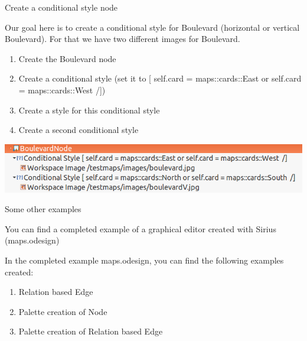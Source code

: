 \begin{frame}[allowframebreaks]{Create a conditional style node}

	Our goal here is to create a conditional style for Boulevard (horizontal or vertical Boulevard). For that we have two different images for Boulevard.

	\begin{enumerate}
		\item Create the Boulevard node
		\item Create a conditional style (set it to [ self.card = maps::cards::East or self.card = maps::cards::West  /])
		\item Create a style for this conditional style
		\item Create a second conditional style
	\end{enumerate}

	\centering
	\includegraphics[scale=0.3]{figs/BoulevardNode.png}
	
\end{frame}

\begin{frame}[allowframebreaks]{Some other examples}

	
	You can find a completed example of a graphical editor created with Sirius (maps.odesign)


	
	In the completed example maps.odesign, you can find the following examples created:

	\begin{enumerate}
		\item Relation based Edge
		\item Palette creation of Node
		\item Palette creation of Relation based Edge
	\end{enumerate}

\end{frame}
